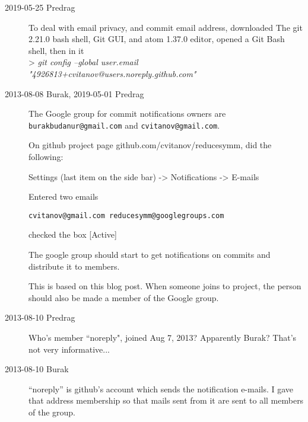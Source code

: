 \begin{description}

\item[2019-05-25 Predrag]
To deal with 
{email privacy}, and
{commit email address},
downloaded
The  {git 2.21.0} bash shell, Git GUI,
and 
{atom 1.37.0} editor,
opened a Git Bash shell, then in it
\\
> \emph{git config --global user.email "4926813+cvitanov@users.noreply.github.com"}


\item[2013-08-08 Burak, 2019-05-01 Predrag]
The  {Google
group} for  commit notifications owners are
\texttt{burakbudanur@gmail.com} and \texttt{cvitanov@gmail.com}.

On github project page
{github.com/cvitanov/reducesymm}, did the following:

Settings (last item on the side bar) -> Notifications -> E-mails

Entered two emails

\texttt{cvitanov@gmail.com
reducesymm@googlegroups.com}

checked the box [Active]

The google group should start to get notifications on commits and
distribute it to members.
%

This is based on
{this blog post}.
When someone joins
to project, the person should also be made a member of the
 {Google group}.

\item[2013-08-10 Predrag]
Who's member ``noreply", joined Aug 7, 2013? Apparently Burak? That's not very informative...

\item[2013-08-10 Burak]
``noreply'' is github's account which sends the notification e-mails. I gave that address membership so that mails sent from it are sent
to all members of the group.


\end{description}
